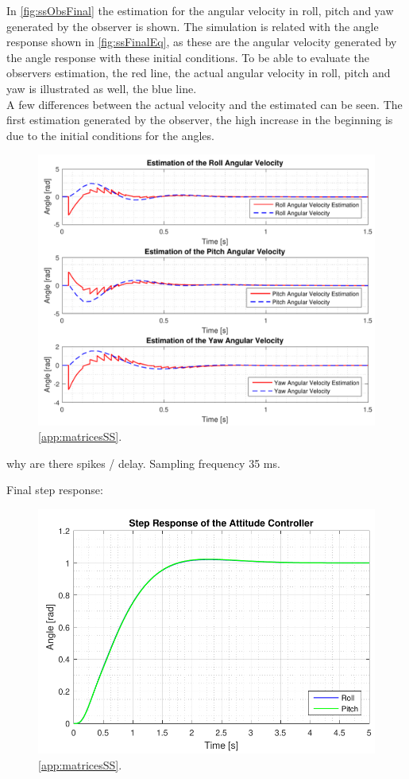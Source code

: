 In \autoref{fig:ssObsFinal} the estimation for the angular velocity in roll, pitch and yaw generated by the observer is shown. The simulation is related with the angle response shown in \autoref{fig:ssFinalEq}, as these are the angular velocity generated by the angle response with these initial conditions. To be able to evaluate the observers estimation, the red line, the actual angular velocity in roll, pitch and yaw is illustrated as well, the blue line. \\
A few differences between the actual velocity and the estimated can be seen. The first estimation generated by the observer, the high increase in the beginning is due to the initial conditions for the angles. 

\begin{figure}[H]
	\centering
	\includegraphics[scale=0.7]{figures/ssObsFinal.pdf}
	\caption{\autoref{app:matricesSS}.}
	\label{fig:ssObsFinal}
\end{figure}

why are there spikes / delay. Sampling frequency 35 ms.

Final step response:

\begin{figure}[H]
	\centering
	\includegraphics[scale=0.8]{figures/ssFinalStep.pdf}
	\caption{\autoref{app:matricesSS}.}
	\label{fig:ssFinalStep}
\end{figure}

